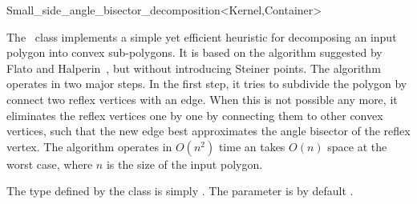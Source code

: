 
\ccRefPageBegin

\begin{ccRefClass}{Small_side_angle_bisector_decomposition<Kernel,Container>}
\label{mink_ref:ssab_decomp}

\ccDefinition

The \ccRefName\ class implements a simple yet efficient heuristic for
decomposing an input polygon into convex sub-polygons. It is based
on the algorithm suggested by Flato and Halperin~\cite{fh-recpm-00},
but without introducing Steiner points. The algorithm operates in two
major steps. In the first step, it tries to subdivide the polygon by
connect two reflex vertices with an edge. When this is not possible any
more, it eliminates the reflex vertices one by one by connecting them
to other convex vertices, such that the new edge best approximates
the angle bisector of the reflex vertex. The algorithm operates in
$O(n^2)$ time an takes $O(n)$ space at the worst case, where $n$ is the
size of the input polygon.

The  type defined by the class is simply
. The  parameter
is by default .


\ccIsModel

\end{ccRefClass}

\ccRefPageEnd
